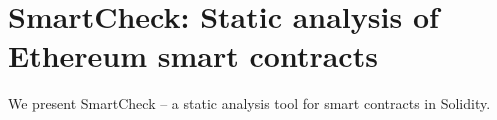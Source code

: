 \chapter{SmartCheck: Static analysis of Ethereum smart contracts}

\label{Chapter11_SmartCheck}

We present SmartCheck -- a static analysis tool for smart contracts in Solidity.
